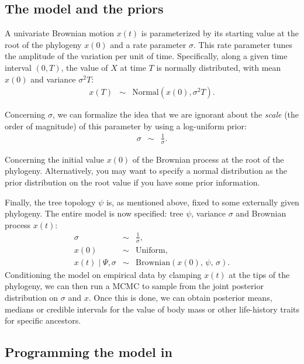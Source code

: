 \subsection{The model and the priors}

A univariate Brownian motion $x(t)$ is parameterized by its starting value at the root of the phylogeny $x(0)$ and a rate parameter $\sigma$. This rate parameter tunes the amplitude of the variation per unit of time. Specifically, along a given time interval $(0,T)$, the value of $X$ at time $T$ is normally distributed, with mean $x(0)$ and variance $\sigma^2 T$:
\begin{eqnarray*}
x(T) & \sim & \text{Normal} \left( x(0), \sigma^2 T \right).
\end{eqnarray*}

Concerning $\sigma$, we can formalize the idea that we are ignorant about the \emph{scale} (the order of magnitude) of this parameter by using a log-uniform prior:
\begin{eqnarray*}
\sigma &\sim& \frac{1}{\sigma}.
\end{eqnarray*}

Concerning the initial value $x(0)$ of the Brownian process at the root of the phylogeny.
Alternatively, you may want to specify a normal distribution as the prior distribution on the root value if you have some prior information.

Finally, the tree topology $\psi$ is, as mentioned above, fixed to some externally given phylogeny.
The entire model is now specified: tree $\psi$, variance $\sigma$ and Brownian process $x(t)$:
\begin{eqnarray*}
\sigma &\sim& \frac{1}{\sigma},
\\
x(0) &\sim& \text{Uniform},
\\
x(t) \mid \Psi, \sigma &\sim& \text{Brownian} \left( x(0), \, \psi, \, \sigma \right).
\end{eqnarray*}
Conditioning the model on empirical data by clamping $x(t)$ at the tips of the phylogeny, we can then run a MCMC to sample from the joint posterior distribution on $\sigma$ and $x$. Once this is done, we can obtain posterior means, medians or credible intervals for the value of body mass or other life-history traits for specific ancestors.


\subsection{Programming the model in \RevBayes}

